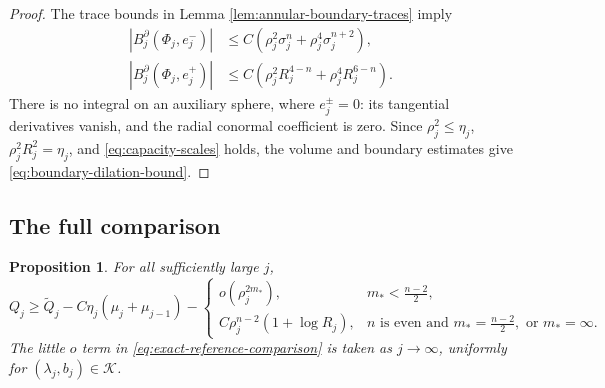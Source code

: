 \documentclass[11pt]{article}
\numberwithin{equation}{section}
\newtheorem{proposition}[theorem]{Proposition}
\theoremstyle{remark}
\begin{document}
\begin{proof}
The trace bounds in Lemma  \ref{lem:annular-boundary-traces} imply
\begin{equation}\label{eq:linear-boundary-extension-surface}
 \begin{aligned}
 | B_j^\partial(\Phi_j,e_j^-)|
 &\le C(\rho_j^2\sigma_j^n+\rho_j^4\sigma_j^{n+2}),\\
 | B_j^\partial(\Phi_j,e_j^+)|
 &\le C(\rho_j^2R_j^{4-n}+\rho_j^4R_j^{6-n}).
 \end{aligned}
\end{equation}
There is no integral on an auxiliary sphere, where \(e_j^\pm=0\):
its tangential derivatives vanish, and the radial conormal coefficient
is zero.
Since \(\rho_j^2\le\eta_j\), \(\rho_j^2R_j^2=\eta_j\), and
\eqref{eq:capacity-scales} holds, the volume and boundary estimates give
\eqref{eq:boundary-dilation-bound}.
\end{proof}

\par
\subsection{The full comparison}

\begin{proposition}\label{prop:exact-reference-comparison}
For all sufficiently large \(j\),
\begin{equation}\label{eq:exact-reference-comparison}
 Q_j\ge\widetilde Q_j-C\eta_j(\mu_j+\mu_{j-1})
 -\begin{cases}
  o(\rho_j^{2m_*}),&m_*<\frac{n-2}{2},\\
  C\rho_j^{n-2}(1+\log R_j),&n\text{ is even and }m_*=\frac{n-2}{2},\text{ or }m_*=\infty.
 \end{cases}
\end{equation}
The little \(o\) term in \eqref{eq:exact-reference-comparison} is taken as
\(j\to\infty\), uniformly for
\((\lambda_j,b_j)\in\mathcal K\).
\end{proposition}
\end{document}
